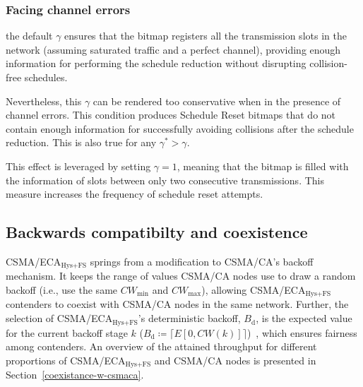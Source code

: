 	
		\subsubsection{Facing channel errors}\label{aggr}
		
		the default $\gamma$ ensures that the bitmap registers all the transmission slots in the network (assuming saturated traffic and a perfect channel), providing enough information for performing the schedule reduction without disrupting collision-free schedules. 
		
		Nevertheless, this $\gamma$ can be rendered too conservative when in the presence of channel errors. This condition produces Schedule Reset bitmaps that do not contain enough information for successfully avoiding collisions after the schedule reduction. This is also true for any $\gamma^{*}>\gamma$.
		
		This effect is leveraged by setting $\gamma=1$, meaning that the bitmap is filled with the information of slots between only two consecutive transmissions. This measure increases the frequency of schedule reset attempts.
	
	\subsection{Backwards compatibilty and coexistence}
	CSMA/ECA$_{\text{Hys+FS}}$ springs from a modification to CSMA/CA's backoff mechanism. It keeps the range of values CSMA/CA nodes use to draw a random backoff (i.e., use the same $CW_{\min}$ and $CW_{\max}$), allowing CSMA/ECA$_{\text{Hys+FS}}$ contenders to coexist with CSMA/CA nodes in the same network. Further, the selection of CSMA/ECA$_{\text{Hys+FS}}$'s deterministic backoff, $B_{\text{d}}$, is the expected value for the current backoff stage $k$ ($B_{\text{d}}\coloneqq\lceil{E[0,CW(k)]}\rceil$)~\cite{research2standards}, which ensures fairness among contenders. An overview of the attained throughput for different proportions of CSMA/ECA$_{\text{Hys+FS}}$ and CSMA/CA nodes is presented in Section~\ref{coexistance-w-csmaca}.
	
	